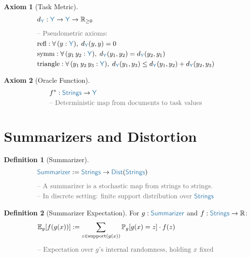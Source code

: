 \documentclass[11pt]{article}
\theoremstyle{definition}
\newtheorem{axiomenv}{Axiom}
\newtheorem{defnenv}{Definition}
\theoremstyle{plain}
\newcommand{\ty}[1]{\textcolor{type}{\mathsf{#1}}}
\newcommand{\fn}[1]{\mathrm{#1}}
\newcommand{\cmt}[1]{\textcolor{comment}{\text{-- #1}}}
\newcommand{\all}{\forall\,}
\newcommand{\arr}{\to}
\newcommand{\defeq}{:=}
\newcommand{\Strings}{\ty{Strings}}
\newcommand{\Y}{\ty{Y}}
\newcommand{\Rnn}{\mathbb{R}_{\geq 0}}
\newcommand{\R}{\mathbb{R}}
\newcommand{\Dist}[1]{\ty{Dist}(#1)}
\newcommand{\fstar}{f^*}
\newcommand{\dY}{d_{\Y}}
\newcommand{\Eg}{\mathbb{E}_g}
\newcommand{\Prob}{\mathbb{P}}
\begin{document}
\begin{axiomenv}[Task Metric]
\label{ax:metric}
\begin{align*}
&\dY : \Y \arr \Y \arr \Rnn \\[6pt]
&\cmt{Pseudometric axioms:} \\
&\fn{refl} : \all (y : \Y),\; \dY(y, y) = 0 \\
&\fn{symm} : \all (y_1\, y_2 : \Y),\; \dY(y_1, y_2) = \dY(y_2, y_1) \\
&\fn{triangle} : \all (y_1\, y_2\, y_3 : \Y),\; \dY(y_1, y_3) \leq \dY(y_1, y_2) + \dY(y_2, y_3)
\end{align*}
\end{axiomenv}

\begin{axiomenv}[Oracle Function]
\label{ax:oracle}
\begin{align*}
&\fstar : \Strings \arr \Y \\
&\cmt{Deterministic map from documents to task values}
\end{align*}
\end{axiomenv}

\section{Summarizers and Distortion}
\label{sec:summarizer}

\begin{defnenv}[Summarizer]
\label{def:summarizer}
\begin{align*}
&\ty{Summarizer} \defeq \Strings \arr \Dist{\Strings} \\[6pt]
&\cmt{A summarizer is a stochastic map from strings to strings.} \\
&\cmt{In discrete setting: finite support distribution over } \Strings
\end{align*}
\end{defnenv}

\begin{defnenv}[Summarizer Expectation]
\label{def:Eg}
For $g : \ty{Summarizer}$ and $f : \Strings \arr \R$:
\begin{align*}
&\Eg[f(g(x))] \defeq \sum_{z \in \fn{support}(g(x))} \Prob_g[g(x) = z] \cdot f(z) \\[6pt]
&\cmt{Expectation over $g$'s internal randomness, holding $x$ fixed}
\end{align*}
\end{defnenv}
\end{document}
